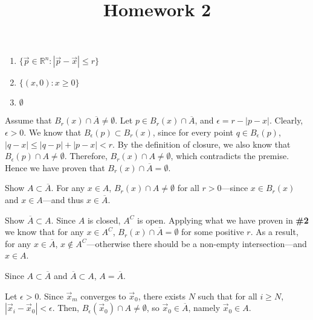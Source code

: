 \documentclass{homework}
\title{Homework 2}
\begin{document}
\maketitle

\begin{problem}{1}
\begin{enumerate}
\item $\{\vec{p} \in \mathbb{R}^n : |\vec{p} - \vec{x}| \leq r\}$
\item $\{(x, 0) : x \geq 0\}$
\item $\emptyset$
\end{enumerate}
\end{problem}

\begin{problem}{2}
Assume that $B_r(x) \cap \overline{A} \neq \emptyset$. Let $p \in B_r(x) \cap \overline{A}$, and $\epsilon = r - |p - x|$. Clearly, $\epsilon > 0$. We know that $B_{\epsilon}(p) \subset B_r(x)$, since for every point $q \in B_{\epsilon}(p)$, $|q - x| \leq |q - p| + |p - x| < r$. By the definition of closure, we also know that $B_{\epsilon}(p) \cap A \neq \emptyset$. Therefore, $B_r(x) \cap A \neq \emptyset$, which contradicts the premise. Hence we have proven that $B_r(x) \cap \overline{A} = \emptyset$. \QED
\end{problem}

\begin{problem}{3}
Show $A \subset \overline{A}$. For any $x \in A$, $B_r(x) \cap A \neq \emptyset$ for all $r > 0$---since $x \in B_r(x)$ and $x \in A$---and thus $x \in \overline{A}$.

Show $\overline{A} \subset A$. Since $A$ is closed, $A^C$ is open. Applying what we have proven in \textbf{\#2} we know that for any $x \in A^C$, $B_r(x) \cap \overline{A} = \emptyset$ for some positive $r$. As a result, for any $x \in \overline{A}$, $x \notin A^C$---otherwise there should be a non-empty intersection---and $x \in A$.

Since $A \subset \overline{A}$ and $\overline{A} \subset A$, $A = \overline{A}$. \QED
\end{problem}

\begin{problem}{4}
Let $\epsilon > 0$. Since $\vec{x}_m$ converges to $\vec{x}_0$, there exists $N$ such that for all $i \geq N$, $|\vec{x}_i - \vec{x}_0| < \epsilon$. Then, $B_{\epsilon}(\vec{x}_0) \cap A \neq \emptyset$, so $\vec{x}_0 \in \overline{A}$, namely $\vec{x}_0 \in A$.
\end{problem}
\end{document}
